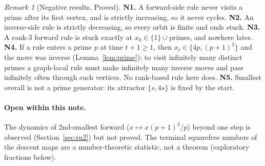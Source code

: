 \documentclass[11pt]{article}
\theoremstyle{remark}\newtheorem{remark}[theorem]{Remark}
\begin{document}
\begin{remark}[Negative results, Proved]\label{rem:neg}
\textbf{N1.} A forward-side rule never visits a prime after its first vertex, and is strictly increasing, so it never cycles. \textbf{N2.} An inverse-side rule is strictly decreasing, so every orbit is finite and ends stuck. \textbf{N3.} A rank-3 forward rule is stuck exactly at $x_0\in\{1\}\cup\text{primes}$, and nowhere later. \textbf{N4.} If a rule enters a prime $p$ at time $t+1\ge1$, then $x_t\in\{4p,(p+1)^2\}$ and the move was inverse (Lemma~\ref{lem:prime}); to visit infinitely many distinct primes a graph-local rule must make infinitely many inverse moves and pass infinitely often through such vertices. No rank-based rule here does. \textbf{N5.} Smallest overall is not a prime generator: its attractor $\{s,4s\}$ is fixed by the start.
\end{remark}

\paragraph{Open within this note.} The dynamics of 2nd-smallest forward ($x\mapsto x(p+1)^2/p$) beyond one step is observed (Section~\ref{sec:rn2}) but not proved. The terminal squarefree numbers of the descent maps are a number-theoretic statistic, not a theorem (exploratory fractions below).
\end{document}
